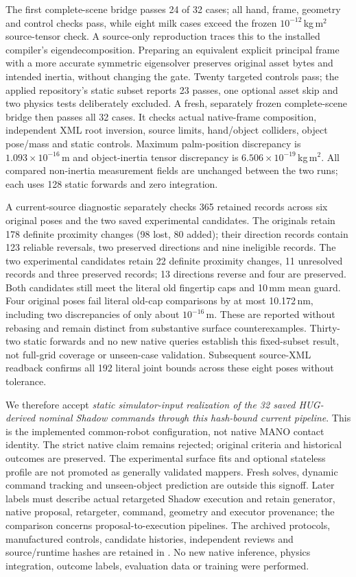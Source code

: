 The first complete-scene bridge passes 24 of 32 cases; all hand, frame,
geometry and control checks pass, while eight milk cases exceed the frozen
$10^{-12}$\,kg\,m$^2$ source-tensor check. A source-only reproduction traces
this to the installed compiler's eigendecomposition. Preparing an equivalent
explicit principal frame with a more accurate symmetric eigensolver preserves
original asset bytes and intended inertia, without changing the gate.
Twenty targeted controls pass; the applied repository's static subset reports
23 passes, one optional asset skip and two physics tests deliberately excluded.
A fresh, separately frozen complete-scene bridge then passes all 32 cases.
It checks actual native-frame composition, independent XML root inversion,
source limits, hand/object colliders, object pose/mass and static controls.
Maximum palm-position discrepancy is $1.093\times10^{-16}$\,m and object-inertia
tensor discrepancy is $6.506\times10^{-19}$\,kg\,m$^2$.
All compared non-inertia measurement fields are unchanged between the two runs; each uses
128 static forwards and zero integration.

A current-source diagnostic separately checks 365 retained records across
six original poses and the two saved experimental candidates. The originals
retain 178 definite proximity changes (98 lost, 80 added); their direction
records contain 123 reliable reversals, two preserved directions and nine
ineligible records. The two experimental candidates retain 22 definite
proximity changes, 11 unresolved records and three preserved records; 13
directions reverse and four are preserved. Both candidates still meet the
literal old fingertip caps and 10\,mm mean guard. Four original poses fail
literal old-cap comparisons by at most 10.172\,nm, including two discrepancies
of only about $10^{-16}$\,m. These are reported without rebasing and remain
distinct from substantive surface counterexamples. Thirty-two static forwards
and no new native queries establish this fixed-subset result, not full-grid
coverage or unseen-case validation. Subsequent source-XML readback confirms
all 192 literal joint bounds across these eight poses without tolerance.

We therefore accept \emph{static simulator-input realization of the 32 saved
HUG-derived nominal Shadow commands through this hash-bound current pipeline}.
This is the implemented common-robot configuration, not native MANO contact
identity. The strict native claim remains rejected; original criteria and
historical outcomes are preserved. The experimental surface fits and optional
stateless profile are not promoted as generally validated mappers. Fresh solves,
dynamic command tracking and unseen-object prediction are outside this
signoff. Later labels must describe actual retargeted Shadow execution and
retain generator, native proposal, retargeter, command, geometry and executor
provenance; the comparison concerns proposal-to-execution pipelines.
The archived protocols, manufactured controls, candidate histories, independent
reviews and source/runtime hashes are retained in
.
No new native inference, physics integration, outcome labels, evaluation data
or training were performed.


